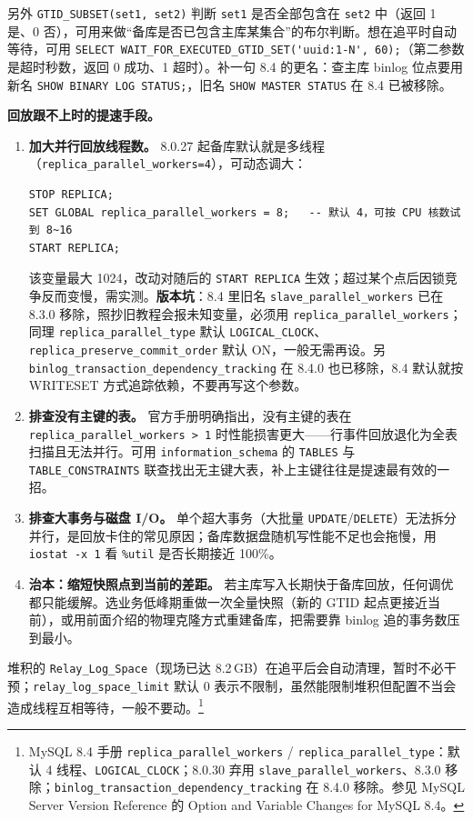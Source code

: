 \documentclass[12pt,UTF8]{ctexbook}
\begin{document}
另外 \verb|GTID_SUBSET(set1, set2)| 判断 \texttt{set1} 是否全部包含在 \texttt{set2} 中（返回 1 是、0 否），可用来做“备库是否已包含主库某集合”的布尔判断。想在追平时自动等待，可用 \verb|SELECT WAIT_FOR_EXECUTED_GTID_SET('uuid:1-N', 60);|（第二参数是超时秒数，返回 0 成功、1 超时）。补一句 8.4 的更名：查主库 binlog 位点要用新名 \verb|SHOW BINARY LOG STATUS;|，旧名 \verb|SHOW MASTER STATUS| 在 8.4 已被移除。

\textbf{回放跟不上时的提速手段。}

\begin{enumerate}
  \item \textbf{加大并行回放线程数。} 8.0.27 起备库默认就是多线程（\verb|replica_parallel_workers=4|），可动态调大：
  \begin{lstlisting}
STOP REPLICA;
SET GLOBAL replica_parallel_workers = 8;   -- 默认 4，可按 CPU 核数试到 8~16
START REPLICA;
  \end{lstlisting}
  该变量最大 1024，改动对随后的 \verb|START REPLICA| 生效；超过某个点后因锁竞争反而变慢，需实测。\textbf{版本坑}：8.4 里旧名 \verb|slave_parallel_workers| 已在 8.3.0 移除，照抄旧教程会报未知变量，必须用 \verb|replica_parallel_workers|；同理 \verb|replica_parallel_type| 默认 \verb|LOGICAL_CLOCK|、\verb|replica_preserve_commit_order| 默认 ON，一般无需再设。另 \verb|binlog_transaction_dependency_tracking| 在 8.4.0 也已移除，8.4 默认就按 WRITESET 方式追踪依赖，不要再写这个参数。
  \item \textbf{排查没有主键的表。} 官方手册明确指出，没有主键的表在 \verb|replica_parallel_workers > 1| 时性能损害更大——行事件回放退化为全表扫描且无法并行。可用 \verb|information_schema| 的 \verb|TABLES| 与 \verb|TABLE_CONSTRAINTS| 联查找出无主键大表，补上主键往往是提速最有效的一招。
  \item \textbf{排查大事务与磁盘 I/O。} 单个超大事务（大批量 \verb|UPDATE|/\verb|DELETE|）无法拆分并行，是回放卡住的常见原因；备库数据盘随机写性能不足也会拖慢，用 \verb|iostat -x 1| 看 \verb|%util| 是否长期接近 100\%。
  \item \textbf{治本：缩短快照点到当前的差距。} 若主库写入长期快于备库回放，任何调优都只能缓解。选业务低峰期重做一次全量快照（新的 GTID 起点更接近当前），或用前面介绍的物理克隆方式重建备库，把需要靠 binlog 追的事务数压到最小。
\end{enumerate}

堆积的 \texttt{Relay\_Log\_Space}（现场已达 8.2\,GB）在追平后会自动清理，暂时不必干预；\verb|relay_log_space_limit| 默认 0 表示不限制，虽然能限制堆积但配置不当会造成线程互相等待，一般不要动。\footnote{MySQL 8.4 手册 \texttt{replica\_parallel\_workers} / \texttt{replica\_parallel\_type}：默认 4 线程、\texttt{LOGICAL\_CLOCK}；8.0.30 弃用 \texttt{slave\_parallel\_workers}、8.3.0 移除；\texttt{binlog\_transaction\_dependency\_tracking} 在 8.4.0 移除。参见 MySQL Server Version Reference 的 Option and Variable Changes for MySQL 8.4。}
\end{document}
